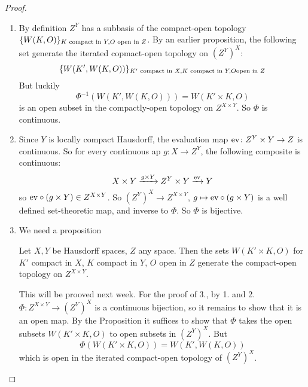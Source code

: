 \documentclass[language=english]{TemplateLecture}
\begin{document}
\begin{proof}
    \begin{enumerate}
        \item By definition \(Z^Y\) has a subbasis of the compact-open topology \(\{W(K,O)\}_{K \text{ compact in } Y, O \text{ open in } Z}\). By an earlier proposition, the following set generate the iterated copmact-open topology on \((Z^Y)^X\):
        \[\{W(K', W(K,O))\}_{K' \text{ compact in }X, K \text{ compact in } Y, O \text{open in } Z}\]
        But luckily
        \[\Phi^{-1}(W(K', W(K,O))) = W(K' \times K, O)\]
        is an open subset in the compactly-open topology on \(Z^{X\times Y}\). So \(\Phi\) is continuous.
        \item Since \(Y\) is locally compact Hausdorff, the evaluation map \(\mathrm{ev}\colon Z^Y \times Y \to Z\) is continuous. So for every continuous ap \(g\colon X \to Z^Y\), the following composite is continuous:
        \[X\times Y \xrightarrow{g \times Y} Z^Y \times Y \xrightarrow{\mathrm{ev}} Y\]
        so \(\mathrm{ev} \circ (g \times Y) \in Z^{X\times Y}\). So \((Z^Y)^X \to Z^{X\times Y}\), \(g \mapsto \mathrm{ev} \circ (g \times Y)\) is a well defined set-theoretic map, and inverse to \(\Phi\). So \(\Phi\) is bijective.
        \item We need a proposition
        \begin{proposition}\label{prop:kp}
            Let \(X,Y\) be Hausdorff spaces, \(Z\) any space. Then the sets \(W(K'\times K, O)\) for \(K'\) compact in \(X\), \(K\) compact in \(Y\), \(O\) open in \(Z\) generate the compact-open topology on \(Z^{X \times Y}\).
        \end{proposition}
        This will be prooved next week.
        For the proof of 3., by 1. and 2. \(\Phi\colon Z^{X\times Y} \to (Z^Y)^X\) is a continuous bijection, so it remains to show that it is an open map. By the Proposition it suffices to show that \(\Phi\) takes the open subsets \(W(K' \times K, O)\) to open subsets in \((Z^Y)^X\). But
        \[\Phi(W(K'\times K, O)) = W(K', W(K,O))\]
        which is open in the iterated compact-open topology of \((Z^Y)^X\).
    \end{enumerate}
\end{proof}

\end{document}
